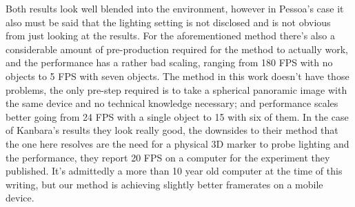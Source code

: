 Both results look well blended into the environment, however in Pessoa's case it also must be said that the lighting setting is not disclosed and is not obvious from just looking at the results. For the aforementioned method there's also a considerable amount of pre-production required for the method to actually work, and the performance has a rather bad scaling, ranging from 180 FPS with no objects to 5 FPS with seven objects. The method in this work doesn't have those problems, the only pre-step required is to take a spherical panoramic image with the same device and no technical knowledge necessary;  and performance scales better going from 24 FPS with a single object to 15 with six of them.\newline
In the case of Kanbara's results they look really good, the downsides to their method that the one here resolves are the need for a physical 3D marker to probe lighting and the performance, they report 20 FPS on a computer for the experiment they published. It's admittedly a more than 10 year old computer at the time of this writing, but our method is achieving slightly better framerates on a mobile device.\newline


